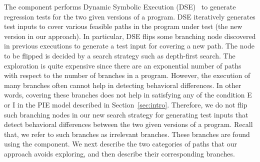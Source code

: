 The  component performs Dynamic Symbolic Execution (DSE)~\cite{Clarke:symbolic, king:symex, dart, cute, exe} to 
generate regression tests for the two given versions of a program. DSE iteratively generates test inputs to cover various feasible paths in the program under test (the new version in our approach). In particular, DSE flips some branching node discovered in previous executions to generate a test input for covering a new path. The node to be flipped is decided by a search strategy such as depth-first search. 
The exploration is quite expensive since there are an exponential 
number of paths with respect to the number of branches in a program.
 However, the execution of many branches often cannot help in detecting behavioral differences. 
 In other words, covering these branches does not help in satisfying any of the condition E or I in the PIE model described in Section~\ref{sec:intro}. 
 Therefore, we do not flip such branching nodes in our new search strategy for generating test inputs that detect 
 behavioral differences between the two given versions of a program. Recall that, we refer to such branches as irrelevant branches. These branches are found using the   component.
 We next describe the two categories of paths that our approach avoids exploring, and then describe their corresponding branches.
 
